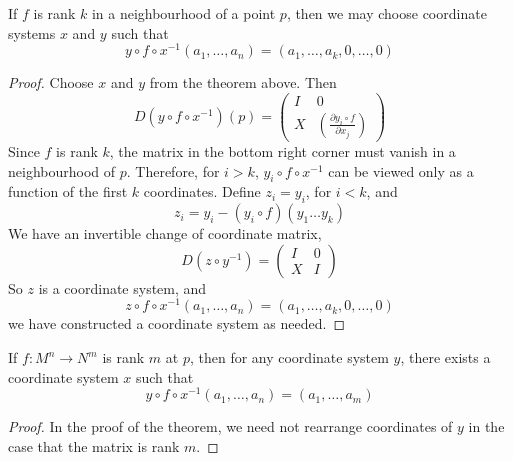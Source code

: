 \begin{corollary}
    If $f$ is rank $k$ in a neighbourhood of a point $p$, then we may choose coordinate systems $x$ and $y$ such that
    \[ y \circ f \circ x^{-1}(a_1, \dots, a_n) = (a_1, \dots, a_k, 0, \dots, 0) \]
\end{corollary}
\begin{proof}
    Choose $x$ and $y$ from the theorem above. Then
    \[ D(y \circ f \circ x^{-1})(p) = \begin{pmatrix} I & 0 \\ X & \left( \frac{\partial y_i \circ f}{\partial x_j} \right) \end{pmatrix} \]
    Since $f$ is rank $k$, the matrix in the bottom right corner must vanish in a neighbourhood of $p$. Therefore, for $i > k$, $y_i \circ f \circ x^{-1}$ can be viewed only as a function of the first $k$ coordinates. Define $z_i = y_i$, for $i < k$, and
    \[ z_i = y_i - (y_i \circ f)(y_1 \dots y_k) \]
    We have an invertible change of coordinate matrix,
    \[ D(z \circ y^{-1}) = \begin{pmatrix} I & 0 \\ X & I \end{pmatrix} \]
    So $z$ is a coordinate system, and
    \[ z \circ f \circ x^{-1}(a_1, \dots, a_n) = (a_1, \dots, a_k, 0, \dots, 0) \]
    we have constructed a coordinate system as needed.
\end{proof}

\begin{corollary}
    If $f: M^n \to N^m$ is rank $m$ at $p$, then for any coordinate system $y$, there exists a coordinate system $x$ such that
    \[ y \circ f \circ x^{-1} (a_1, \dots, a_n) = (a_1, \dots, a_m) \]
\end{corollary}
\begin{proof}
    In the proof of the theorem, we need not rearrange coordinates of $y$ in the case that the matrix is rank $m$.
\end{proof}

